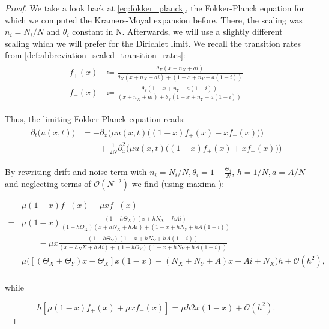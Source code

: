 \documentclass[12pt,a4paper,twoside]{article}
\begin{document}
\begin{proof}
	We take a look back at \eqref{eq:fokker_planck}, the Fokker-Planck equation for which we computed the Kramers-Moyal expansion before.
	There, the scaling was $n_i = N_i/N$ and $\theta_i$ constant in N. Afterwards, we will use a slightly different scaling which we will prefer for the Dirichlet limit. We recall the transition rates from \eqref{def:abbreviation_scaled_transition_rates}:
	\begin{align}
	\begin{split}
	f_+(x) &\coloneqq \frac{\theta_X (x+ n_X+ ai)}{\theta_X (x + n_X + ai) + (1-x + n_Y + a(1-i))}\\
	f_-(x) &\coloneqq \frac{\theta_Y(1-x+n_Y+a(1-i))}{(x+n_X+ai) + \theta_Y(1-x+n_Y+a(1-i))}
	\end{split}
	\end{align}
	
	Thus, the limiting Fokker-Planck equation reads:
	\begin{align}
	\begin{split}\label{eq:limiting_fokker-planck}
	\partial_t \big(u\left(x, t\right)\big) &= -\partial_x\Big(\mu u(x,t)\big(\left(1-x\right)f_+(x) - xf_-(x)\big)\Big) \\
	&\qquad + \frac{1}{2N} \partial^2_x\Big(\mu u(x,t)\big(\left(1-x\right)f_+(x) + xf_-(x)\big)\Big)
	\end{split}
	\end{align}
	
	By rewriting drift and noise term with $n_i = N_i/N, \theta_i = 1- \frac{\Theta_i}{N}$, $h = 1/N, a = A/N$ and neglecting terms of $\mathcal{O}(N^{-2})$ we find (using maxima \cite{Maxima2014}):
	
	\begin{align*}
	& \mu(1-x)f_+(x) - \mu xf_-(x)\\
	= & \mu(1-x) \frac{(1-h\Theta_X) (x+ hN_X+ hAi)}{(1-h\Theta_X) (x + hN_X + hAi) + (1-x + hN_Y + hA(1-i))}\\
	&\qquad - \mu x \frac{(1-h\Theta_Y)(1-x+hN_Y+hA(1-i))}{(x+h_NX+hAi) + (1-h\Theta_Y)(1-x+hN_Y+hA(1-i))}\\
	=& \mu\Big(\left[\left(\Theta_X + \Theta_Y\right)x - \Theta_X\right]x\left(1-x\right)-\left(N_X + N_Y + A\right)x + Ai + N_X\Big)h+ \mathcal{O}(h^2),\\
	\end{align*}
	
	while 
	
	\begin{equation*}
	h\left[\mu(1-x)f_+(x) + \mu xf_-(x)\right] = \mu h 2x(1-x) + \mathcal{O}(h^2).
	\end{equation*}
	

\end{proof}
\end{document}
